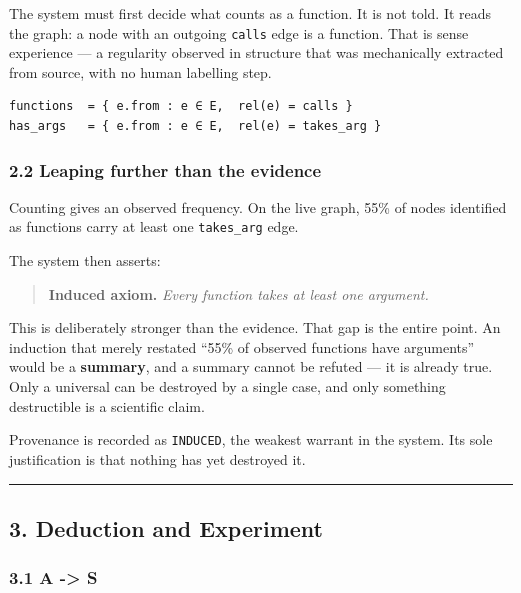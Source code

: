 \documentclass[
  11pt,
  a4paper,
]{article}
\begin{document}
The system must first decide what counts as a function. It is not told.
It reads the graph: a node with an outgoing \texttt{calls} edge is a
function. That is sense experience --- a regularity observed in
structure that was mechanically extracted from source, with no human
labelling step.

\begin{verbatim}
functions  = { e.from : e ∈ E,  rel(e) = calls }
has_args   = { e.from : e ∈ E,  rel(e) = takes_arg }
\end{verbatim}

\subsubsection{2.2 Leaping further than the
evidence}\label{leaping-further-than-the-evidence}

Counting gives an observed frequency. On the live graph, 55\% of nodes
identified as functions carry at least one \texttt{takes\_arg} edge.

The system then asserts:

\begin{quote}
\textbf{Induced axiom.} \emph{Every function takes at least one
argument.}
\end{quote}

This is deliberately stronger than the evidence. That gap is the entire
point. An induction that merely restated ``55\% of observed functions
have arguments'' would be a \textbf{summary}, and a summary cannot be
refuted --- it is already true. Only a universal can be destroyed by a
single case, and only something destructible is a scientific claim.

Provenance is recorded as \texttt{INDUCED}, the weakest warrant in the
system. Its sole justification is that nothing has yet destroyed it.

\begin{center}\rule{0.5\linewidth}{0.5pt}\end{center}

\subsection{3. Deduction and Experiment}\label{deduction-and-experiment}

\subsubsection{3.1 A -\textgreater{} S}\label{a---s}
\end{document}
